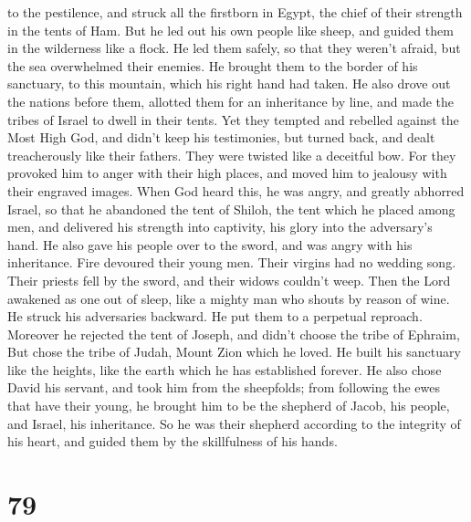 to the pestilence,  and struck all the firstborn in
Egypt, the chief of their strength in the tents of Ham. 
But he led out his own people like sheep, and guided them in the
wilderness like a flock.  He led them safely, so that
they weren't afraid, but the sea overwhelmed their enemies.
 He brought them to the border of his sanctuary, to this
mountain, which his right hand had taken.  He also drove
out the nations before them, allotted them for an inheritance by line,
and made the tribes of Israel to dwell in their tents. 
Yet they tempted and rebelled against the Most High God, and didn't keep
his testimonies,  but turned back, and dealt
treacherously like their fathers. They were twisted like a deceitful
bow.  For they provoked him to anger with their high
places, and moved him to jealousy with their engraved images.
 When God heard this, he was angry, and greatly abhorred
Israel,  so that he abandoned the tent of Shiloh, the
tent which he placed among men,  and delivered his
strength into captivity, his glory into the adversary's hand.
 He also gave his people over to the sword, and was angry
with his inheritance.  Fire devoured their young men.
Their virgins had no wedding song.  Their priests fell by
the sword, and their widows couldn't weep.  Then the Lord
awakened as one out of sleep, like a mighty man who shouts by reason of
wine.  He struck his adversaries backward. He put them to
a perpetual reproach.  Moreover he rejected the tent of
Joseph, and didn't choose the tribe of Ephraim,  But
chose the tribe of Judah, Mount Zion which he loved.  He
built his sanctuary like the heights, like the earth which he has
established forever.  He also chose David his servant,
and took him from the sheepfolds;  from following the
ewes that have their young, he brought him to be the shepherd of Jacob,
his people, and Israel, his inheritance.  So he was their
shepherd according to the integrity of his heart, and guided them by the
skillfulness of his hands.

\hypertarget{section-78}{%
\section{79}\label{section-78}}

